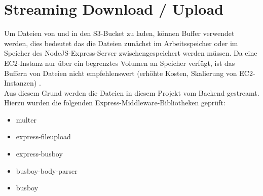 \documentclass[a4paper, 12pt]{scrreprt}
\renewcommand\_{\textunderscore\allowbreak}
\begin{document}
\section{Streaming Download / Upload}
\label{updown}

Um Dateien von und in den S3-Bucket zu laden, können Buffer verwendet werden, dies bedeutet das die Dateien zunächst im Arbeitsspeicher oder im Speicher des NodeJS-Express-Server zwischengespeichert werden müssen. Da eine EC2-Instanz nur über ein begrenztes Volumen an Speicher verfügt, ist das Buffern von Dateien nicht empfehlenswert (erhöhte Kosten, Skalierung von EC2-Instanzen) \cite{AWS}.\\
Aus diesem Grund werden die Dateien in diesem Projekt vom Backend gestreamt. Hierzu wurden die folgenden Express-Middleware-Bibliotheken geprüft:

\begin{itemize}
\item multer
\item express-fileupload
\item express-busboy
\item busboy-body-parser
\item busboy
\end{itemize}
\end{document}
